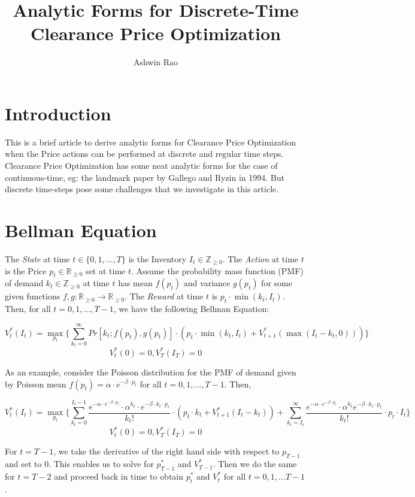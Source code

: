 \documentclass[12pt]{amsart}
\title{Analytic Forms for Discrete-Time Clearance Price Optimization}
\author{Ashwin Rao}
\date{} %
\begin{document}
   
   \maketitle 
   \section{Introduction}
   This is a brief article to derive analytic forms for Clearance Price Optimization when the Price actions can be performed at discrete and regular time steps. Clearance Price Optimization has some neat analytic forms for the case of continuous-time, eg: the landmark paper by Gallego and Ryzin in 1994. But discrete time-steps pose some challenges that we investigate in this article.    
   \section{Bellman Equation}
    The {\em State} at time $t \in \{0, 1, \ldots, T\}$ is the Inventory $I_t \in \mathbb{Z}_{\geq 0}$. The {\em Action} at time $t$ is the Price $p_t \in \mathbb{R}_{\geq 0}$ set at time $t$. Assume the probability mass function (PMF) of demand $k_t \in \mathbb{Z}_{\geq 0}$ at time $t$ has mean $f(p_t)$ and variance $g(p_t)$ for some given functions $f, g : \mathbb{R}_{\geq 0} \rightarrow \mathbb{R}_{\geq 0}$. The {\em Reward} at time $t$ is $p_t \cdot \min(k_t, I_t)$. Then, for all $t = 0, 1, \ldots, T-1$, we have the following Bellman Equation:
    
    $$V_t^*(I_t) = \max_{p_t} \{ \sum_{k_t=0}^{\infty} Pr[k_t; f(p_t), g(p_t)] \cdot (p_t \cdot \min(k_t, I_t) + V_{t+1}^*(\max(I_t - k_t, 0))) \}$$
    $$V_t^*(0) = 0, V_T^*(I_T) = 0$$
   
   As an example, consider the Poisson distribution for the PMF of demand given by Poisson mean $f(p_t) = \alpha \cdot e^{-\beta \cdot p_t}$ for all $t = 0, 1, \ldots, T-1$. Then,
   
    $$V_t^*(I_t) = \max_{p_t} \{ \sum_{k_t=0}^{I_t - 1} \frac {e^{-\alpha \cdot e^{-\beta \cdot p_t}} \cdot \alpha^{k_t} \cdot e^{-\beta \cdot k_t \cdot p_t}} {k_t!} \cdot (p_t \cdot k_t + V_{t+1}^*(I_t - k_t)) +  \sum_{k_t=I_t}^{\infty} \frac {e^{-\alpha \cdot e^{-\beta \cdot p_t}} \cdot \alpha^{k_t} e^{-\beta \cdot k_t \cdot p_t}} {k_t!} \cdot p_t \cdot I_t \}$$
    $$V_t^*(0) = 0, V_T^*(I_T) = 0$$
   
   For $t=T-1$, we take the derivative of the right hand side with respect to $p_{T-1}$ and set to 0. This enables us to solve for $p_{T-1}^*$ and $V_{T-1}^*$. Then we do the same for $t=T-2$ and proceed back in time to obtain $p_t^*$ and $V_t^*$ for all $t = 0, 1, \ldots T-1$.
   
\end{document}
